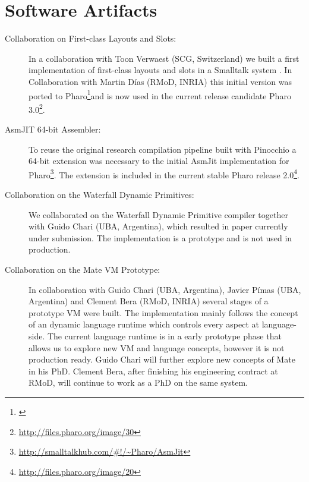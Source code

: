 \section{Software Artifacts}
\begin{description}
	\item[Collaboration on First-class Layouts and Slots:]
In a collaboration with Toon Verwaest (SCG, Switzerland) we built a first implementation of first-class layouts and slots in a Smalltalk system \cite{Verw11a}.
In Collaboration with Martin Días (RMoD, INRIA) this initial version was ported to Pharo\footnote{\url{}}and is now used in the current release candidate Pharo 3.0\footnote{\url{http://files.pharo.org/image/30}}.

	\item[AsmJIT 64-bit Assembler:]
To reuse the original research compilation pipeline built with Pinocchio \cite{Verw10a, Brun11a} a 64-bit extension was necessary to the initial AsmJit implementation for Pharo\footnote{\url{http://smalltalkhub.com/\#!/~Pharo/AsmJit}}.
The extension is included in the current stable Pharo release 2.0\footnote{\url{http://files.pharo.org/image/20}}.

	\item[Collaboration on the Waterfall Dynamic Primitives:]
We collaborated on the Waterfall Dynamic Primitive compiler together with Guido Chari (UBA, Argentina), which resulted in paper currently under submission\cite{Char13a}.
The implementation is a prototype and is not used in production.

	\item[Collaboration on the Mate VM Prototype:]
In collaboration with Guido Chari (UBA, Argentina), Javier Pímas (UBA, Argentina) and Clement Bera (RMoD, INRIA) several stages of a prototype VM were built.
The implementation mainly follows the concept of an dynamic language runtime which controls every aspect at language-side.
The current language runtime is in a early prototype phase that allows us to explore new VM and language concepts, however it is not production ready.
Guido Chari will further explore new concepts of Mate in his PhD.
Clement Bera, after finishing his engineering contract at RMoD, will continue to work as a PhD on the same system.


\end{description}
